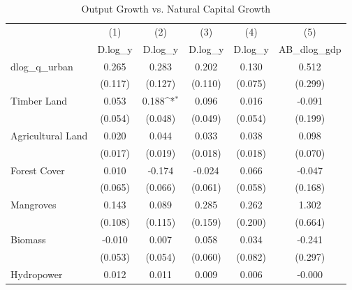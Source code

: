 \begin{table}[htbp]\centering
\def\sym#1{\ifmmode^{#1}\else\(^{#1}\)\fi}
\caption{Output Growth vs. Natural Capital Growth}
\begin{tabular}{l*{5}{c}}
\hline\hline
            &\multicolumn{1}{c}{(1)}&\multicolumn{1}{c}{(2)}&\multicolumn{1}{c}{(3)}&\multicolumn{1}{c}{(4)}&\multicolumn{1}{c}{(5)}\\
            &\multicolumn{1}{c}{D.log\_y}&\multicolumn{1}{c}{D.log\_y}&\multicolumn{1}{c}{D.log\_y}&\multicolumn{1}{c}{D.log\_y}&\multicolumn{1}{c}{AB\_dlog\_gdp}\\
\hline
dlog\_q\_urban&       0.265       &       0.283       &       0.202       &       0.130       &       0.512       \\
            &     (0.117)       &     (0.127)       &     (0.110)       &     (0.075)       &     (0.299)       \\
[1em]
Timber Land &       0.053       &       0.188\sym{*}&       0.096       &       0.016       &      -0.091       \\
            &     (0.054)       &     (0.048)       &     (0.049)       &     (0.054)       &     (0.199)       \\
[1em]
Agricultural Land &       0.020       &       0.044       &       0.033       &       0.038       &       0.098       \\
            &     (0.017)       &     (0.019)       &     (0.018)       &     (0.018)       &     (0.070)       \\
[1em]
Forest Cover &       0.010       &      -0.174       &      -0.024       &       0.066       &      -0.047       \\
            &     (0.065)       &     (0.066)       &     (0.061)       &     (0.058)       &     (0.168)       \\
[1em]
Mangroves &       0.143       &       0.089       &       0.285       &       0.262       &       1.302       \\
            &     (0.108)       &     (0.115)       &     (0.159)       &     (0.200)       &     (0.664)       \\
[1em]
Biomass &      -0.010       &       0.007       &       0.058       &       0.034       &      -0.241       \\
            &     (0.053)       &     (0.054)       &     (0.060)       &     (0.082)       &     (0.297)       \\
[1em]
Hydropower &       0.012       &       0.011       &       0.009       &       0.006       &      -0.000       \\

\end{tabular}
\end{table}
